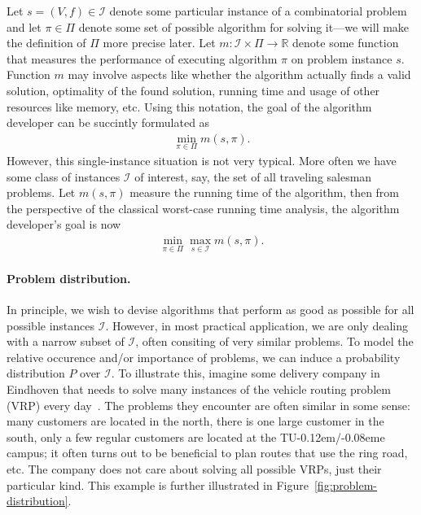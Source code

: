 \documentclass[a4paper]{report}
\theoremstyle{definition}
\theoremstyle{plain}
\newcommand{\TUE}{TU\kern-0.12em/\kern-0.08eme }
\begin{document}
%
Let $s = (V, f) \in \mathcal{I}$ denote some particular instance of a
combinatorial problem and let $\pi \in \Pi$ denote some set of possible
algorithm for solving it---we will make the definition of $\Pi$ more precise
later.
%
Let $m : \mathcal{I} \times \Pi \rightarrow \mathbb{R}$ denote some function
that measures the performance of executing algorithm $\pi$ on problem instance
$s$. Function $m$ may involve aspects like whether the algorithm actually finds
a valid solution, optimality of the found solution, running time and usage of
other resources like memory, etc.
%
Using this notation, the goal of the algorithm developer can be succintly
formulated as
\begin{align}
  \min_{\pi \in \Pi} m(s, \pi) .
\end{align}
However, this single-instance situation is not very typical. More often we have
some class of instances $\mathcal{I}$ of interest, say, the set of all traveling
salesman problems.
%
Let $m(s, \pi)$ measure the running time of the algorithm, then from the
perspective of the classical worst-case running time analysis, the algorithm
developer's goal is now
\begin{align}
  \label{eq:min-max-runtime}
  \min_{\pi \in \Pi} \max_{s \in \mathcal{I}} m(s, \pi) .
\end{align}

\paragraph{Problem distribution.}

In principle, we wish to devise algorithms that perform as good as possible for
all possible instances $\mathcal{I}$. However, in most practical application, we
are only dealing with a narrow subset of $\mathcal{I}$, often consiting of very
similar problems.
%
To model the relative occurence and/or importance of problems, we can induce a
probability distribution $P$ over $\mathcal{I}$.
%
To illustrate this, imagine some delivery company in Eindhoven that needs to
solve many instances of the vehicle routing problem (VRP) every day~\cite{bengioMachineLearningCombinatorial2020}. The
problems they encounter are often similar in some sense: many customers are
located in the north, there is one large customer in the south, only a few
regular customers are located at the \TUE campus; it often turns out to be
beneficial to plan routes that use the ring road, etc. The company does not care
about solving all possible VRPs, just their particular kind. This example is
further illustrated in Figure~\ref{fig:problem-distribution}.
\end{document}
